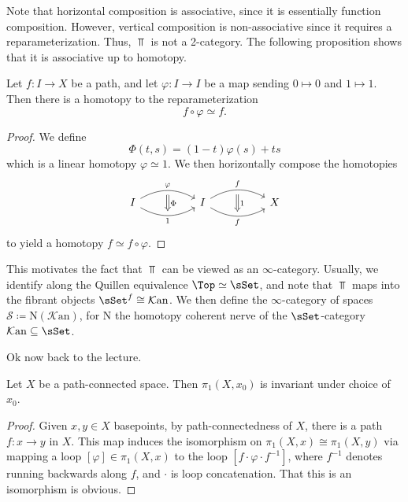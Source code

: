 Note that horizontal composition is associative, since it is essentially function composition. However, vertical composition is non-associative since it requires a reparameterization. Thus, $\Top $ is not a 2-category. The following proposition shows that it is associative up to homotopy.


\begin{proposition}\label{prp:1-1-8}
	Let $f : I \to X$ be a path, and let $\varphi : I \to I$ be a map sending $0\mapsto 0$ and $1\mapsto 1$. Then there is a homotopy to the reparameterization
	\[
		f\circ \varphi \simeq f
	.\]
\end{proposition}
\begin{proof}
	We define
	\[
		\Phi (t,s) = (1-t)\varphi (s)+ts
	\]
	which is a linear homotopy $\varphi \simeq 1$. We then horizontally compose the homotopies
	\[
		\begin{tikzcd}[row sep = 2.5em, column sep = 5em]
			I \ar[" \varphi  "{name=vp}, bend left, r] \ar[" 1 "'{name=id}, bend right, r]  & I \ar[" f "{name=f1}, bend left, r] \ar[" f "'{name=f2}, bend right, r]  & X
			\ar[r, Rightarrow, shorten <= 4pt, shorten >= 4pt, from=vp, to=id, " \Phi  "] \ar[Rightarrow, shorten <= 4pt, shorten >= 4pt, "1", from=f1, to=f2] 
	\end{tikzcd}
	\]
	to yield a homotopy $f\simeq f\circ \varphi $.
\end{proof}

This motivates the fact that $\Top $ can be viewed as an $\infty $-category. Usually, we identify along the Quillen equivalence $\Top \simeq \sSet $, and note that $\Top $ maps into the fibrant objects $\sSet ^f \cong \mathcal{K} \mathrm{an} $. We then define the $\infty $-category of spaces $\mathcal{S} \coloneqq \mathrm{N} (\mathcal{K} \mathrm{an} )$, for $\mathrm{N} $ the homotopy coherent nerve of the $\sSet $-category $\mathcal{K} \mathrm{an} \subseteq \sSet $.

Ok now back to the lecture.

\begin{proposition}\label{prp:1-1-9}
	Let $X$ be a path-connected space. Then $\pi _1(X,x_0)$ is invariant under choice of $x_0$.
\end{proposition}
\begin{proof}
	Given $x,y\in X$ basepoints, by path-connectedness of $X$, there is a path $f : x \to y$ in $X$. This map induces the isomorphism on $\pi_1(X,x)\cong \pi _1(X,y)$ via mapping a loop $[\varphi] \in \pi _1(X,x)$ to the loop $[f\cdot \varphi \cdot f^{-1} ]$, where $f^{-1} $ denotes running backwards along $f$, and $\cdot $ is loop concatenation. That this is an isomorphism is obvious.
\end{proof}

